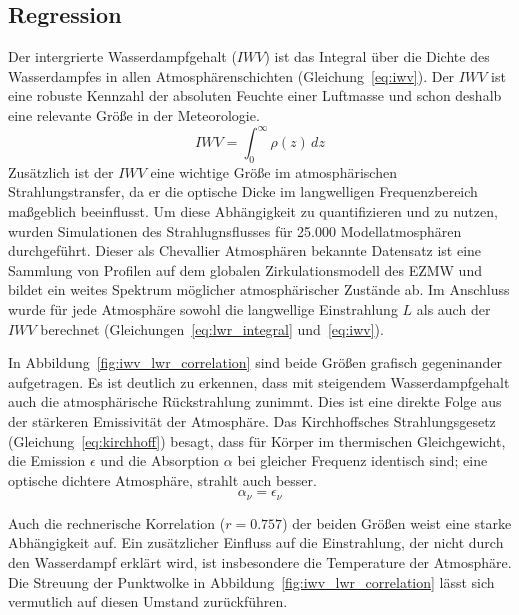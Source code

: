 \documentclass[10pt,a4paper,compsoc,peer review papers]{IEEEtran}
\begin{document}
\subsection{Regression}\label{subsec:iwv_regression}
Der intergrierte Wasserdampfgehalt ($IWV$) ist das Integral über die Dichte des
Wasserdampfes in allen Atmosphärenschichten (Gleichung~\ref{eq:iwv}). Der $IWV$
ist eine robuste Kennzahl der absoluten Feuchte einer Luftmasse und schon
deshalb eine relevante Größe in der Meteorologie.
\begin{equation}\label{eq:iwv}
  IWV = \int_0^\infty \rho(z) \, dz
\end{equation}
Zusätzlich ist der $IWV$ eine wichtige Größe im atmosphärischen
Strahlungstransfer, da er die optische Dicke im langwelligen Frequenzbereich
maßgeblich beeinflusst. Um diese Abhängigkeit zu quantifizieren und zu nutzen,
wurden Simulationen des Strahlugnsflusses für 25.000 Modellatmosphären
durchgeführt. Dieser als Chevallier \cite{Chevallier2006} Atmosphären bekannte
Datensatz ist eine Sammlung von Profilen auf dem globalen Zirkulationsmodell
des EZMW und bildet ein weites Spektrum möglicher atmosphärischer Zustände ab.
Im Anschluss wurde für jede Atmosphäre sowohl die langwellige Einstrahlung $L$
als auch der $IWV$ berechnet (Gleichungen~\ref{eq:lwr_integral}
und~\ref{eq:iwv}). 

In Abbildung~\ref{fig:iwv_lwr_correlation} sind beide Größen grafisch gegeninander
aufgetragen. Es ist deutlich zu erkennen, dass mit steigendem Wasserdampfgehalt
auch die atmosphärische Rückstrahlung zunimmt. Dies ist eine direkte Folge aus
der stärkeren Emissivität der Atmosphäre. Das Kirchhoffsches Strahlungsgesetz
(Gleichung~\ref{eq:kirchhoff}) besagt, dass für Körper im thermischen
Gleichgewicht, die Emission $\epsilon$ und die Absorption $\alpha$ bei gleicher
Frequenz identisch sind; eine optische dichtere Atmosphäre, strahlt auch besser.
\begin{equation}\label{eq:kirchhoff}
  \alpha_\nu = \epsilon_\nu
\end{equation}

Auch die rechnerische Korrelation ($r = 0.757$) der beiden Größen weist eine
starke Abhängigkeit auf. Ein zusätzlicher Einfluss auf die Einstrahlung,
der nicht durch den Wasserdampf erklärt wird, ist insbesondere die Temperature
der Atmosphäre. Die Streuung der Punktwolke in
Abbildung~\ref{fig:iwv_lwr_correlation} lässt sich vermutlich auf diesen
Umstand zurückführen.
\end{document}

